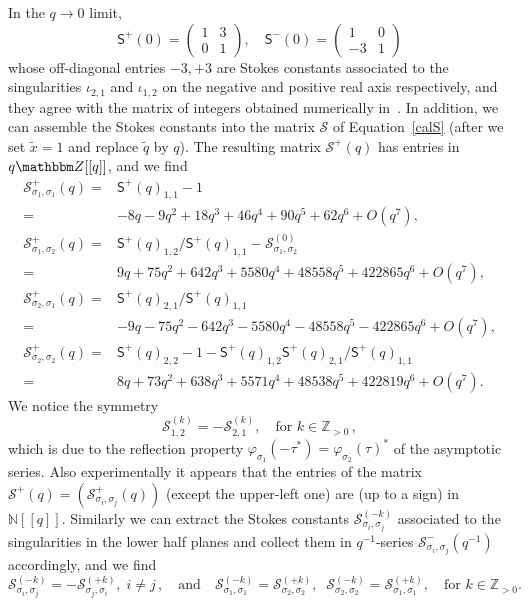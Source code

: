 \documentclass[12pt,reqno]{amsart}
\theoremstyle{definition}
\def\BZ{\mathbbm Z}
\def\IZ{\mathbb{Z}}
\def\calS{\mathcal S}
\def\s{\sigma}
\def\tq{\tilde{q}}
\def\tx{\tilde{x}}
\def\-{\,-\,}
\def\tx{\tilde{x}}
\def\mc{\mathcal}
\def\ms{\mathsf}
\def\cO{O}
\def\IN{\mathbb{N}}
\def\IZ{\mathbb{Z}}
\newcommand{\nn}{\nonumber \\}
\begin{document}
In the $q\rightarrow 0$ limit,
\begin{equation}
  \ms{S}^+(0) =
  \begin{pmatrix}
    1&3\\0&1
  \end{pmatrix},\quad
  \ms{S}^-(0) =
  \begin{pmatrix}
    1&0\\-3&1
  \end{pmatrix}
  \label{eq:S0u041}
\end{equation}
whose off-diagonal entries $-3,+3$ are Stokes constants associated to
the singularities $\iota_{2,1}$ and $\iota_{1,2}$ on the negative and
positive real axis respectively, and they agree with the matrix of
integers obtained numerically in~\cite{gh-res,GZ:kashaev}. In
addition, we can assemble the Stokes constants into
the matrix $\calS$ of Equation~\eqref{calS} (after we set $\tx=1$
and replace $\tq$ by $q$). The resulting matrix $\mc{S}^+(q)$
has entries in $q\BZ[[q]]$, and we find
\begin{align}
  \mc{S}^+_{\s_1,\s_1}(q) =
  &\ms{S}^+(q)_{1,1}-1\nn=
  &-8 q - 9 q^2 + 18 q^3 + 46 q^4 + 90 q^5 + 62 q^6+\cO(q^7),\\
  \mc{S}^+_{\s_1,\s_2}(q) =
  &\ms{S}^+(q)_{1,2}/\ms{S}^+(q)_{1,1}-\mc{S}^{(0)}_{\s_1,\s_2}\nn=
  &9 q + 75 q^2 + 642 q^3 + 5580 q^4 + 48558 q^5 + 422865 q^6+\cO(q^7),\\
  \mc{S}^+_{\s_2,\s_1}(q) =
  &\ms{S}^+(q)_{2,1}/\ms{S}^+(q)_{1,1}\nn=
  &-9 q - 75 q^2 - 642 q^3 - 5580 q^4 - 48558 q^5 - 422865 q^6+\cO(q^7),\\
  \mc{S}^+_{\s_2,\s_2}(q) =
  &\ms{S}^+(q)_{2,2} -1-
    \ms{S}^+(q)_{1,2}\ms{S}^+(q)_{2,1}/\ms{S}^+(q)_{1,1}\nn=
  &8 q + 73 q^2 + 638 q^3 + 5571 q^4 + 48538 q^5 + 422819 q^6+\cO(q^7).
\end{align}
We notice the symmetry
\begin{equation}
  \mc{S}^{(k)}_{1,2}=
  -\mc{S}^{(k)}_{2,1},\quad \text{for } k\in\IZ_{>0}\,,
\end{equation}
which is due to the reflection property
$\varphi_{\s_1}(-\tau^*)= \varphi_{\s_2}(\tau)^*$ of the asymptotic
series.  Also experimentally it appears that the entries of the matrix
$\mc{S}^+(q) = (\mc{S}^+_{\s_i,\s_j}(q))$ (except the upper-left one)
are (up to a sign) in $\IN[[q]]$.
Similarly we can extract the Stokes constants
$\mc{S}^{(-k)}_{\s_i,\s_j}$ associated to the singularities in the
lower half planes and collect them in $q^{-1}$-series
$\mc{S}^-_{\s_i,\s_j}(q^{-1})$ accordingly, and we find
\begin{equation}
  \mc{S}_{\s_i,\s_j}^{(-k)} = -\mc{S}^{(+k)}_{\s_j,\s_i},\;i\neq j\,,
  \quad\text{and}\quad \mc{S}_{\s_1,\s_1}^{(-k)}  =
  \mc{S}_{\s_2,\s_2}^{(+k)},\;\; \mc{S}_{\s_2,\s_2}^{(-k)}  =
  \mc{S}_{\s_1,\s_1}^{(+k)},\quad \text{for } k\in \IZ_{>0}.
\end{equation}
\end{document}
